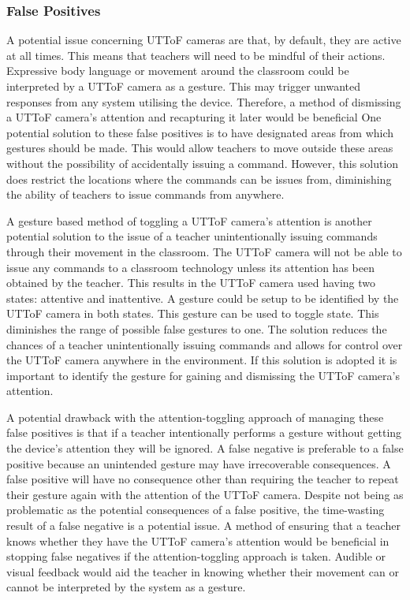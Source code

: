 \documentclass[manuscript, review, screen]{acmart}
\begin{document}
\subsubsection{False Positives}  
\label{sec:attention}

A potential issue concerning \ac{UTToF} cameras are that, by default, they are active at all times.
This means that teachers will need to be mindful of their actions.
Expressive body language or movement around the classroom could be interpreted by a \ac{UTToF} camera as a gesture.
This may trigger unwanted responses from any system utilising the device.
Therefore, a method of dismissing a \ac{UTToF} camera's attention and recapturing it later would be beneficial 
One potential solution to these false positives is to have designated areas from which gestures should be made.
This would allow teachers to move outside these areas without the possibility of accidentally issuing a command.
However, this solution does restrict the locations where the commands can be issues from, diminishing the ability of teachers to issue commands from anywhere.

A gesture based method of toggling a \ac{UTToF} camera's attention is another potential solution to the issue of a teacher unintentionally issuing commands through their movement in the classroom.
The \ac{UTToF} camera will not be able to issue any commands to a classroom technology unless its attention has been obtained by the teacher.
This results in the \ac{UTToF} camera used having two states: attentive and inattentive.
A gesture could be setup to be identified by the \ac{UTToF} camera in both states.
This gesture can be used to toggle state.
This diminishes the range of possible false gestures to one.
The solution reduces the chances of a teacher unintentionally issuing commands and allows for control over the \ac{UTToF} camera anywhere in the environment.
If this solution is adopted it is important to identify the gesture for gaining and dismissing the \ac{UTToF} camera's attention.

A potential drawback with the attention-toggling approach of managing these false positives is that if a teacher intentionally performs a gesture without getting the device's attention they will be ignored.
A false negative is preferable to a false positive because an unintended gesture may have irrecoverable consequences.
A false positive will have no consequence other than requiring the teacher to repeat their gesture again with the attention of the \ac{UTToF} camera.
Despite not being as problematic as the potential consequences of a false positive, the time-wasting result of a false negative is a potential issue.
A method of ensuring that a teacher knows whether they have the \ac{UTToF} camera's attention would be beneficial in stopping false negatives if the attention-toggling approach is taken.
Audible or visual feedback would aid the teacher in knowing whether their movement can or cannot be interpreted by the system as a gesture.
\end{document}

